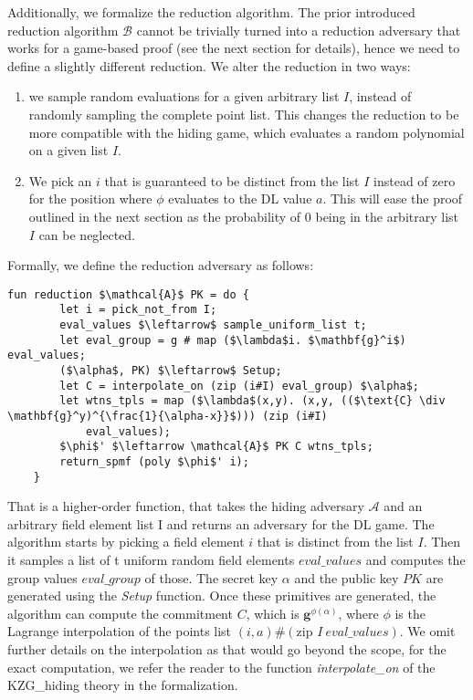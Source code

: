 Additionally, we formalize the reduction algorithm.
The prior introduced reduction algorithm $\mathcal{B}$ cannot be trivially turned into a reduction adversary that works for a game-based proof (see the next section for details), hence we need to define a slightly different reduction. We alter the reduction in two ways: 
\begin{enumerate}
    \item we sample random evaluations for a given arbitrary list $I$, instead of randomly sampling the complete point list. This changes the reduction to be more compatible with the hiding game, which evaluates a random polynomial on a given list $I$. 
    \item We pick an $i$ that is guaranteed to be distinct from the list $I$ instead of zero for the position where $\phi$ evaluates to the DL value $a$. This will ease the proof outlined in the next section as the probability of 0 being in the arbitrary list $I$ can be neglected.
\end{enumerate}
Formally, we define the reduction adversary as follows:
\begin{lstlisting}[language=isabelle]
    fun reduction $\mathcal{A}$ PK = do {
        let i = pick_not_from I;
        eval_values $\leftarrow$ sample_uniform_list t;
        let eval_group = g # map ($\lambda$i. $\mathbf{g}^i$) eval_values;
        ($\alpha$, PK) $\leftarrow$ Setup;
        let C = interpolate_on (zip (i#I) eval_group) $\alpha$;
        let wtns_tpls = map ($\lambda$(x,y). (x,y, (($\text{C} \div \mathbf{g}^y)^{\frac{1}{\alpha-x}}$))) (zip (i#I) 
            eval_values);
        $\phi$' $\leftarrow \mathcal{A}$ PK C wtns_tpls;
        return_spmf (poly $\phi$' i);
    }
\end{lstlisting}
That is a higher-order function, that takes the hiding adversary $\mathcal{A}$ and an arbitrary field element list I and returns an adversary for the DL game.
The algorithm starts by picking a field element $i$ that is distinct from the list $I$. Then it samples a list of t uniform random field elements $eval\_values$ and computes the group values $eval\_group$ of those. 
The secret key $\alpha$ and the public key $PK$ are generated using the \textit{Setup} function.
Once these primitives are generated, the algorithm can compute the commitment $C$, which is $\mathbf{g}^{\phi(\alpha)}$, where $\phi$ is the Lagrange interpolation of the points list $(i, a)\#(\text{zip } I\ eval\_values)$. We omit further details on the interpolation as that would go beyond the scope, for the exact computation, we refer the reader to the function \textit{interpolate\_on} of the KZG\_hiding theory in the formalization.
